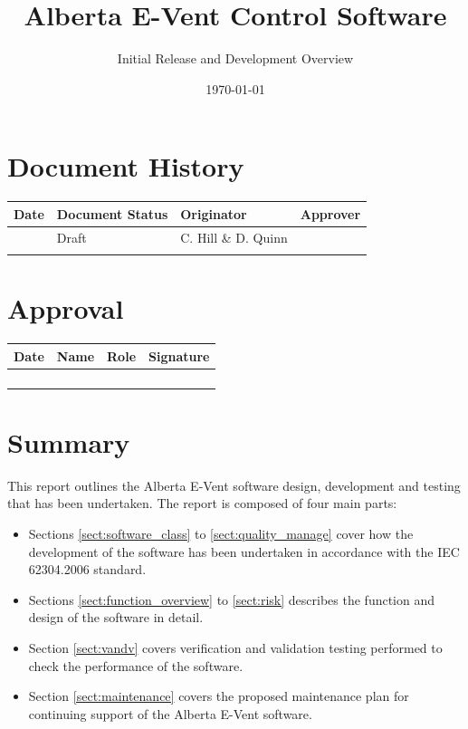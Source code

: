 \documentclass[]{article}
\title{Alberta E-Vent Control Software}
\author{Initial Release and Development Overview}
\begin{document}
	


\maketitle

\newpage

\section*{Document History}
\begin{center}
	\begin{tabular}{ |p{3cm}| p{3cm}| p{3cm}| p{3cm}|}
		\hline
		Date & Document Status & Originator & Approver \\
		\hline 
		 \date{\today} & Draft & C. Hill \& D. Quinn &  \\  
		\hline
		 &   &  & \\ 
		 \hline
	\end{tabular}
\end{center}

\section*{Approval}

\begin{center}
	\begin{tabular}{ |p{3cm}| p{3cm}| p{3cm}| p{3cm}|}
		\hline
		Date & Name & Role & Signature \\
		\hline 
		& &  &  \\  [2ex]
		\hline
		&   &  & \\ [2ex]
		\hline 
		&   &  & \\ [2ex]
		\hline   
		&   &  & \\ [2ex]
		\hline     
	\end{tabular}
\end{center}


\clearpage

\tableofcontents

\clearpage


\section{Summary}

This report outlines the Alberta E-Vent software design, development and testing that has been undertaken.  The report is composed of four main parts:
\begin{itemize}
	\item Sections \ref{sect:software_class} to \ref{sect:quality_manage} cover how the development of the software has been undertaken in accordance with the IEC 62304.2006 standard.
	\item Sections \ref{sect:function_overview} to \ref{sect:risk} describes the function and design of the software in detail.
	\item Section \ref{sect:vandv} covers verification and validation testing performed to check the performance of the software.
	\item Section \ref{sect:maintenance} covers the proposed maintenance plan for continuing support of the Alberta E-Vent software.
\end{itemize}
\end{document}
